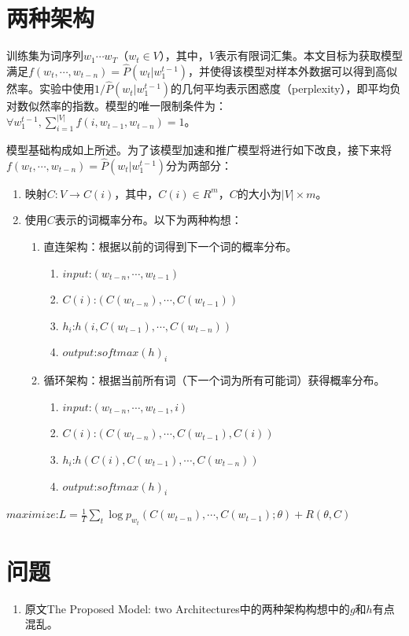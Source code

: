 \documentclass[UTF8]{ctexart}
\begin{document}
\section{两种架构}
\par{训练集为词序列$w_{1}\cdots w_{T}$（$w_{t}\in V$），其中，$V$表示有限词汇集。本文目标为获取模型满足$f(w_{t},\cdots,w_{t-n})=\widehat{P}(w_{t}|w_{1}^{t-1})$，并使得该模型对样本外数据可以得到高似然率。实验中使用$1/\widehat{P}(w_t|w_{1}^{t-1})$的几何平均表示困惑度（perplexity），即平均负对数似然率的指数。模型的唯一限制条件为：$\forall w_{1}^{t-1}, \sum _{i=1}^{|V|}f(i,w_{t-1},w_{t-n})=1$。}
\par{模型基础构成如上所述。为了该模型加速和推广模型将进行如下改良，接下来将$f(w_{t},\cdots,w_{t-n})=\widehat{P}(w_{t}|w_{1}^{t-1})$分为两部分：}
\begin{enumerate}
  \item 映射$C:V\rightarrow C(i)$，其中，$C(i)\in R^{m}$，$C$的大小为$|V| \times m$。
  \item 使用$C$表示的词概率分布。以下为两种构想：
  \begin{enumerate}
    \item 直连架构：根据以前的词得到下一个词的概率分布。
    \begin{enumerate}
      \item $input$:$(w_{t-n},\cdots,w_{t-1})$
      \item $C(i)$:$(C(w_{t-n}),\cdots,C(w_{t-1}))$
      \item $h_{i}$:$h(i,C(w_{t-1}),\cdots,C(w_{t-n}))$
      \item $output$:$softmax(h)_{i}$
    \end{enumerate}
    \item 循环架构：根据当前所有词（下一个词为所有可能词）获得概率分布。
    \begin{enumerate}
      \item $input$:$(w_{t-n},\cdots,w_{t-1},i)$
      \item $C(i)$:$(C(w_{t-n}),\cdots,C(w_{t-1}),C(i))$
      \item $h_{i}$:$h(C(i),C(w_{t-1}),\cdots,C(w_{t-n}))$
      \item $output$:$softmax(h)_{i}$
    \end{enumerate}
  \end{enumerate}
\end{enumerate}
\par{$maximize$:$L=\frac{1}{T}\sum_{t}\log p_{w_{t}}(C(w_{t-n}),\cdots,C(w_{t-1});\theta)+R(\theta,C)$}
\section{问题}
\begin{enumerate}
  \item 原文The Proposed Model: two Architectures中的两种架构构想中的$g$和$h$有点混乱。
\end{enumerate}
\end{document}
